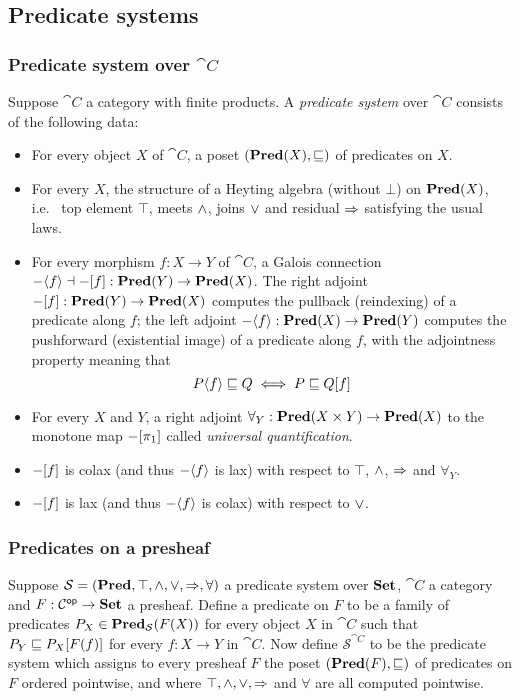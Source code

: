 \subsection{Predicate systems}
\label{sec:predicate-system}

\subsubsection{Predicate system over $\cat{C}$}

Suppose $\cat{C}$ a category with finite products. A \emph{predicate system} over $\cat{C}$ consists of the
following data:
\begin{itemize}
\item For every object $X$ of $\cat{C}$, a poset $(\mathbf{Pred}(X), \sqsubseteq)$ of predicates on $X$.
\item For every $X$, the structure of a Heyting algebra (without $\bot$) on $\mathbf{Pred}(X)$, i.e.~ top element
   $\top$, meets $\wedge$, joins $\vee$ and residual $\Rightarrow$ satisfying the usual laws.
\item For every morphism $f: X \to Y$ of $\cat{C}$, a Galois connection $-\langle f\rangle \dashv
-[f] : \mathbf{Pred}(Y) \to \mathbf{Pred}(X)$. The right adjoint $-[f]: \mathbf{Pred}(Y) \to \mathbf{Pred}(X)$ computes
the pullback (reindexing) of a predicate along $f$; the left adjoint $-\langle f\rangle: \mathbf{Pred}(X) \to
\mathbf{Pred}(Y)$ computes the pushforward (existential image) of a predicate along $f$, with the adjointness property
meaning that
\[P\langle f\rangle \sqsubseteq Q \iff P \sqsubseteq Q[f] \]
\item For every $X$ and $Y$, a right adjoint $\forall_Y: \mathbf{Pred}(X \times Y) \to \mathbf{Pred}(X)$ to the monotone map
$-[\pi_1]$ called \emph{universal quantification}. 
\item $-[f]$ is colax (and thus $-\langle f\rangle$ is lax) with respect to $\top$, $\wedge$,
$\Rightarrow$ and $\forall_Y$.
\item $-[f]$ is lax (and thus $-\langle f\rangle$ is colax) with respect to $\vee$.
\end{itemize}

\subsubsection{Predicates on a presheaf}

Suppose $\mathcal{S} = (\mathbf{Pred}, \top, \wedge, \vee, \Rightarrow, \forall)$ a predicate system over $\mathbf{Set}$,
$\cat{C}$ a category and $F: \mathcal{C}^{\mathsf{op}} \to \mathbf{Set}$ a presheaf. Define a predicate on $F$ to be a family of
predicates $P_X \in \mathbf{Pred}_\mathcal{S}(F(X))$ for every object $X$ in $\cat{C}$ such that $P_Y \sqsubseteq
P_X[F(f)]$ for every $f: X \to Y$ in $\cat{C}$. Now define $\mathcal{S}^{\cat{C}}$ to be the
predicate system which assigns to every presheaf $F$ the poset $(\mathbf{Pred}(F), \sqsubseteq)$ of predicates on $F$
ordered pointwise, and where $\top, \wedge, \vee, \Rightarrow$ and $\forall$ are all computed pointwise.
